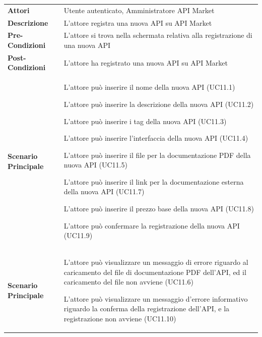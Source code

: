 \begin{longtable}{ l | p{11cm}}
	\hline
	\rowcolor{Gray}
	\multicolumn{2}{c}{UC11 - Registrazione nuova API}\\
	\hline
	\textbf{Attori} & Utente autenticato, Amministratore API Market \\
	\textbf{Descrizione} & L'attore registra una nuova API su API Market \\
	\textbf{Pre-Condizioni} & L'attore si trova nella schermata relativa alla registrazione di una nuova API \\
	\textbf{Post-Condizioni} & L'attore ha registrato una nuova API su API Market \\
	\textbf{Scenario Principale} & 
	\begin{enumerate*}[label=(\arabic*.),itemjoin={\newline}]
		\item L'attore può inserire il nome della nuova API (UC11.1)
		\item L'attore può inserire la descrizione della nuova API (UC11.2)
		\item L'attore può inserire i tag della nuova API (UC11.3)
		\item L'attore può inserire l'interfaccia della nuova API (UC11.4)
		\item L'attore può inserire il file per la documentazione PDF della nuova API (UC11.5)
		\item L'attore può inserire il link per la documentazione esterna della nuova API (UC11.7)
		\item L'attore può inserire il prezzo base della nuova API (UC11.8)
		\item L'attore può confermare la registrazione della nuova API (UC11.9)
	\end{enumerate*}\\
	\textbf{Scenario Principale} & 
	\begin{enumerate*}[label=(\arabic*.),itemjoin={\newline}]
			\item L'attore può visualizzare un messaggio di errore riguardo al caricamento del file di documentazione PDF dell'API, ed il caricamento del file non avviene (UC11.6)
			\item L'attore può visualizzare un messaggio d'errore informativo riguardo la conferma della registrazione dell'API, e la registrazione non avviene (UC11.10)
	\end{enumerate*}\\
\end{longtable}

